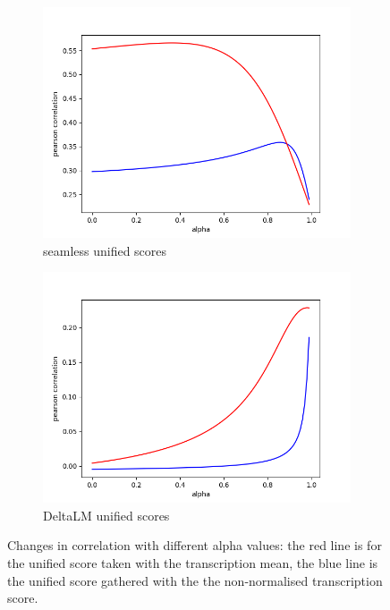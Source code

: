\begin{figure}[ht]
    \centering
    \begin{subfigure}{0.4\linewidth}
        \includegraphics[width=\linewidth]{Latex/sections/images/seamlessuniscoredistribution.png}
        \caption{seamless unified scores}
    \end{subfigure}
    \begin{subfigure}{0.4\linewidth}
        \includegraphics[width=\linewidth]{Latex/sections/images/dlmuniscoredistribution.png}
        \caption{DeltaLM unified scores}
    \end{subfigure}
    
    \caption{Changes in correlation with different alpha values: the red line is for the unified score taken with the transcription mean, the blue line is the unified score gathered with the the non-normalised transcription score. }
    \label{fig:uniscore correlation}
\end{figure}

